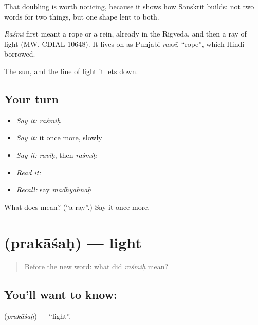 That doubling is worth noticing, because it shows how Sanskrit builds: not two words for two things, but one shape lent to both.

\begin{cousinweb}
\emph{Raśmi} first meant a rope or a rein, already in the Rigveda, and then a ray of light (MW, CDIAL 10648). It lives on as Punjabi \emph{rassī}, \textquotedblleft{}rope\textquotedblright{}, which Hindi borrowed.
\end{cousinweb}

\begin{grammarlens}[title={What you've built}]
The sun, and the line of light it lets down.
\end{grammarlens}

\subsection*{Your turn}
\begin{itemize}
\raggedright
  \item \emph{Say it:} \emph{raśmiḥ}
  \item \emph{Say it:} it once more, slowly
  \item \emph{Say it:} \emph{raviḥ}, then \emph{raśmiḥ}
  \item \emph{Read it:} \textbf{}
  \item \emph{Recall:} say \emph{madhyāhnaḥ}
\end{itemize}

\begin{tcolorbox}[breakable,colback=teal!4,colframe=teal!35!black,title={Before you move on}]
What does  mean? (\textquotedblleft{}a ray\textquotedblright{}.) Say it once more.
\end{tcolorbox}
\section[\texorpdfstring{\sk{प्रकाशः} (prakāśaḥ)}{प्रकाशः (prakāśaḥ)}]{ (prakāśaḥ) — light}

\label{lesson:SA-C46-light}



\begin{quote}
Before the new word: what did \emph{raśmiḥ} mean?
\end{quote}

\subsection*{You'll want to know: }
\textbf{} (\emph{prakāśaḥ}) — \textquotedblleft{}light\textquotedblright{}.

